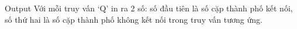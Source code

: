 Output
Với mỗi truy vấn ‘Q’ in ra 2 số: số đầu tiên là số cặp thành phố kết nối, số thứ hai là số cặp thành phố không kết nối trong truy vấn tương ứng.
